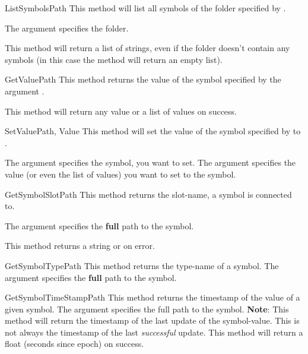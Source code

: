 \begin{methoddesc}[System]{ListSymbols}{Path}
This method will list all symbols of the folder specified by .

The argument  specifies the folder.

This method will return a list of strings, even if the folder doesn't contain 
any symbols (in this case the method will return an empty list).
\end{methoddesc}


\begin{methoddesc}[System]{GetValue}{Path}
This method returns the value of the symbol specified by the argument 
. 

This method will return any value or a list of values on success.
\end{methoddesc}


\begin{methoddesc}[System]{SetValue}{Path, Value}
This method will set the value of the symbol specified by  to 
.

The argument  specifies the symbol, you want to set. The argument 
 specifies the value (or even the list of values) you want to set 
to the symbol.
\end{methoddesc}


\begin{methoddesc}[System]{GetSymbolSlot}{Path}
This method returns the slot-name, a symbol is connected to. 

The argument  specifies the \textbf{full} path
to the symbol.

This method returns a string or  on error.
\end{methoddesc}


\begin{methoddesc}[System]{GetSymbolType}{Path}
This method returns the type-name of a symbol. The argument  
specifies the \textbf{full} path to the symbol.
\end{methoddesc}


\begin{methoddesc}[System]{GetSymbolTimeStamp}{Path}
This method returns the timestamp of the value of a given symbol. The argument
 specifies the full path to the symbol. \textbf{Note}: This method
will return the timestamp of the last update of the symbol-value. This is not 
always the timestamp of the last \emph{successful} update. This method will 
return a float (seconds since epoch) on success.
\end{methoddesc}



